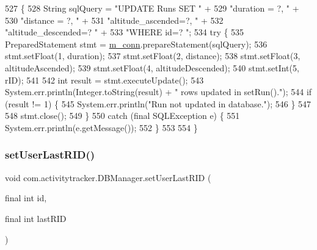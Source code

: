\begin{DoxyCode}
527                                                                                            \{
528         String sqlQuery = \textcolor{stringliteral}{"UPDATE Runs SET "} +
529                 \textcolor{stringliteral}{"duration = ?, "} +
530                 \textcolor{stringliteral}{"distance = ?, "} +
531                 \textcolor{stringliteral}{"altitude\_ascended=?, "} +
532                 \textcolor{stringliteral}{"altitude\_descended=? "} +
533                 \textcolor{stringliteral}{"WHERE id=? "};
534         \textcolor{keywordflow}{try} \{
535             PreparedStatement stmt = \mbox{\hyperlink{classcom_1_1activitytracker_1_1_d_b_manager_a064088d13ac09eb147fdc19268771521}{m\_conn}}.prepareStatement(sqlQuery);
536             stmt.setFloat(1, duration);
537             stmt.setFloat(2, distance);
538             stmt.setFloat(3, altitudeAscended);
539             stmt.setFloat(4, altitudeDescended);
540             stmt.setInt(5, rID);
541 
542             \textcolor{keywordtype}{int} result = stmt.executeUpdate();
543             System.err.println(Integer.toString(result) + \textcolor{stringliteral}{" rows updated in setRun()."});
544             \textcolor{keywordflow}{if} (result != 1) \{
545                 System.err.println(\textcolor{stringliteral}{"Run not updated in database."});
546             \}
547 
548             stmt.close();
549         \}
550         \textcolor{keywordflow}{catch} (\textcolor{keyword}{final} SQLException e) \{
551             System.err.println(e.getMessage());
552         \}
553 
554     \}
\end{DoxyCode}
\mbox{\label{classcom_1_1activitytracker_1_1_d_b_manager_a93b7fc4c2d0083e125852d84f087a8d3}} 
\subsubsection{\texorpdfstring{set\+User\+Last\+R\+I\+D()}{setUserLastRID()}}
{\footnotesize\ttfamily void com.\+activitytracker.\+D\+B\+Manager.\+set\+User\+Last\+R\+ID (\begin{DoxyParamCaption}\item[{final int}]{id,  }\item[{final int}]{last\+R\+ID }\end{DoxyParamCaption})}

